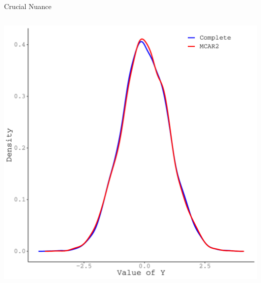 \documentclass{beamer}\usepackage[]{graphicx}\usepackage[]{color}
\newenvironment{knitrout}{}{} %
\begin{document}
\begin{frame}{Crucial Nuance}
\begin{columns}
\begin{column}{0.5\textwidth}
\begin{knitrout}
{\centering \includegraphics[width=1\linewidth]{figure/intro-unnamed-chunk-19-1} 

}


\end{knitrout}

\end{column}
\end{columns}

\end{frame}

\watermarkon %
\end{document}
